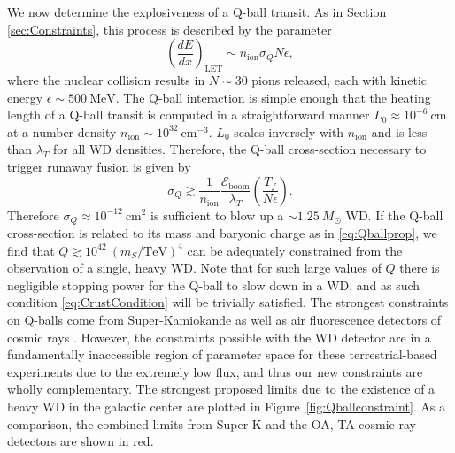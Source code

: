 \documentclass[twocolumn,preprintnumbers,amsmath,amssymb,prl, superscriptaddress]{revtex4}
\newcommand{\Eboom}{\mathcal{E}_\text{boom}}
\def\r{\right)}
\def\l{\left(}
\begin{document}
We now determine the explosiveness of a Q-ball transit.
As in Section \ref{sec:Constraints}, this process is described by the parameter
\begin{equation}
\l\frac{dE}{dx}\r_\text{LET} \sim n_\text{ion} \sigma_Q N \epsilon,
\end{equation}
where the nuclear collision results in $N \sim 30$ pions released, each with kinetic energy $\epsilon \sim 500 ~\text{MeV}$.
The Q-ball interaction is simple enough that the heating length of a Q-ball transit is computed in a straightforward manner $L_0 \approx 10^{-6} ~\text{cm}$ at a number density $n_\text{ion} \sim 10^{32}~\text{cm}^{-3}$.
$L_0$ scales inversely with $n_\text{ion}$ and is less than $\lambda_T$ for all WD densities.
Therefore, the Q-ball cross-section necessary to trigger runaway fusion is given by
\begin{equation}
\sigma_Q \gtrsim \frac{1}{n_\text{ion}} \frac{\Eboom}{\lambda_T} \l \frac{T_f}{N \epsilon} \r. 
\end{equation}
Therefore $\sigma_Q \approx 10^{-12} ~\text{cm}^2$ is sufficient to blow up a $\sim 1.25 ~M_{\odot}$ WD.
If the Q-ball cross-section is related to its mass and baryonic charge as in \eqref{eq:Qballprop}, we find that $Q \gtrsim 10^{42} ~(m_S/\text{TeV})^4$ can be adequately constrained from the observation of a single, heavy WD. 
Note that for such large values of $Q$ there is negligible stopping power for the Q-ball to slow down in a WD, and as such condition \eqref{eq:CrustCondition} will be trivially satisfied.
The strongest constraints on Q-balls come from Super-Kamiokande as well as air fluorescence detectors of cosmic rays \cite{Dine:2003ax}.
However, the constraints possible with the WD detector are in a fundamentally inaccessible region of parameter space for these terrestrial-based experiments due to the extremely low flux, and thus our new constraints are wholly complementary.
The strongest proposed limits due to the existence of a heavy WD in the galactic center are plotted in Figure~\ref{fig:Qballconstraint}. As a comparison, the combined limits from Super-K and the OA, TA cosmic ray detectors are shown in red.
\end{document}
